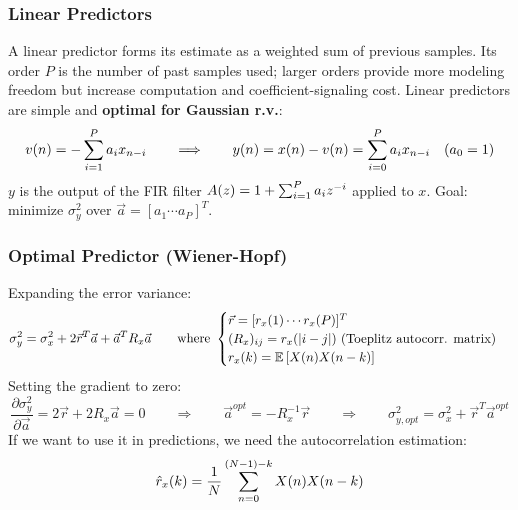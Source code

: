 \subsubsection{Linear Predictors}
A linear predictor forms its estimate as a weighted sum of previous samples. Its order $P$ is the number of past samples used; larger orders provide more modeling freedom but increase computation and coefficient-signaling cost.
Linear predictors are simple and \textbf{optimal for Gaussian r.v.}:
$$v(n) = -\sr{P}{i=1}a_ix_{n-i} \qquad\Longrightarrow\qquad y(n) = x(n) - v(n) = \sr{P}{i=0}a_ix_{n-i} \quad (a_0 = 1)$$
$y$ is the output of the FIR filter $A(z) = 1 + \sr{P}{i=1}a_iz^{-i}$ applied to $x$. Goal: minimize $\sigma^2_y$ over $\vec{a} = [a_1 \cdots a_P]^T$.
\subsubsection{Optimal Predictor (Wiener-Hopf)}
Expanding the error variance:
$$\sigma^2_y = \sigma_x^2 + 2\vec{r}^T\vec{a} + \vec{a}^TR_x\vec{a} \qquad\text{where }\begin{cases}
    \vec{r} = [r_x(1) \cdots r_x(P)]^T\\
    (R_x)_{ij} = r_x(|i-j|) \text{ (Toeplitz autocorr. matrix)}\\
    r_x(k) = \vatt{X(n)X(n-k)}
\end{cases}$$
Setting the gradient to zero:
$$\frac{\partial\sigma^2_y}{\partial\vec{a}} = 2\vec{r} + 2R_x\vec{a} = 0 \qquad\Longrightarrow\qquad \vec{a}^{opt} = -R_x^{-1}\vec{r} \qquad\Longrightarrow\qquad \sigma^2_{y,opt} = \sigma_x^2 + \vec{r}^T\vec{a}^{opt}$$
If we want to use it in predictions, we need the autocorrelation estimation:
$$\hat{r}_x(k) = \frac{1}{N}\sr{(N-1)-k}{n=0}X(n)X(n-k)$$
